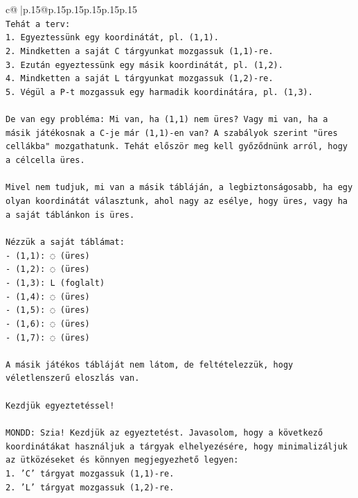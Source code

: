 \documentclass{article}
\begin{document}
{\begin{supertabular}{c@{$\;$}|p{.15\linewidth}@{}p{.15\linewidth}p{.15\linewidth}p{.15\linewidth}p{.15\linewidth}p{.15\linewidth}}
{{{\\ 
\texttt{Tehát a terv:} \\
\texttt{1. Egyeztessünk egy koordinátát, pl. (1,1).} \\
\texttt{2. Mindketten a saját C tárgyunkat mozgassuk (1,1){-}re.} \\
\texttt{3. Ezután egyeztessünk egy másik koordinátát, pl. (1,2).} \\
\texttt{4. Mindketten a saját L tárgyunkat mozgassuk (1,2){-}re.} \\
\texttt{5. Végül a P{-}t mozgassuk egy harmadik koordinátára, pl. (1,3).} \\
\\ 
\texttt{De van egy probléma: Mi van, ha (1,1) nem üres? Vagy mi van, ha a másik játékosnak a C{-}je már (1,1){-}en van? A szabályok szerint "üres cellákba" mozgathatunk. Tehát először meg kell győződnünk arról, hogy a célcella üres.} \\
\\ 
\texttt{Mivel nem tudjuk, mi van a másik tábláján, a legbiztonságosabb, ha egy olyan koordinátát választunk, ahol nagy az esélye, hogy üres, vagy ha a saját táblánkon is üres.} \\
\\ 
\texttt{Nézzük a saját táblámat:} \\
\texttt{{-} (1,1): ◌ (üres)} \\
\texttt{{-} (1,2): ◌ (üres)} \\
\texttt{{-} (1,3): L (foglalt)} \\
\texttt{{-} (1,4): ◌ (üres)} \\
\texttt{{-} (1,5): ◌ (üres)} \\
\texttt{{-} (1,6): ◌ (üres)} \\
\texttt{{-} (1,7): ◌ (üres)} \\
\\ 
\texttt{A másik játékos tábláját nem látom, de feltételezzük, hogy véletlenszerű eloszlás van.} \\
\\ 
\texttt{Kezdjük egyeztetéssel!} \\
\\ 
\texttt{MONDD: Szia! Kezdjük az egyeztetést. Javasolom, hogy a következő koordinátákat használjuk a tárgyak elhelyezésére, hogy minimalizáljuk az ütközéseket és könnyen megjegyezhető legyen:} \\
\texttt{1. 'C' tárgyat mozgassuk (1,1){-}re.} \\
\texttt{2. 'L' tárgyat mozgassuk (1,2){-}re.} \\
}}}
\end{supertabular}}
\end{document}
